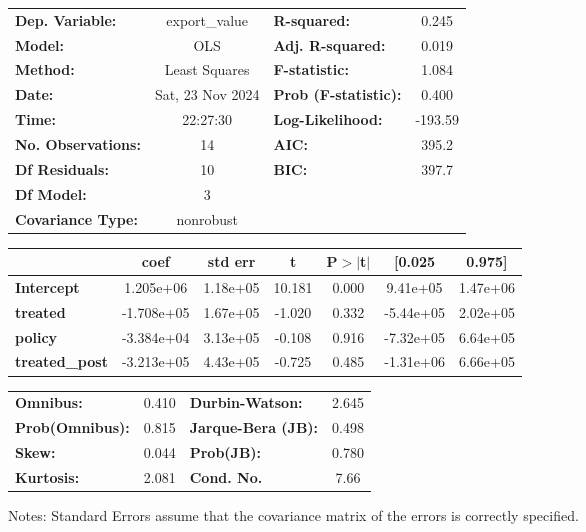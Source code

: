 \begin{center}
\begin{tabular}{lclc}
\toprule
\textbf{Dep. Variable:}    &  export\_value   & \textbf{  R-squared:         } &     0.245   \\
\textbf{Model:}            &       OLS        & \textbf{  Adj. R-squared:    } &     0.019   \\
\textbf{Method:}           &  Least Squares   & \textbf{  F-statistic:       } &     1.084   \\
\textbf{Date:}             & Sat, 23 Nov 2024 & \textbf{  Prob (F-statistic):} &    0.400    \\
\textbf{Time:}             &     22:27:30     & \textbf{  Log-Likelihood:    } &   -193.59   \\
\textbf{No. Observations:} &          14      & \textbf{  AIC:               } &     395.2   \\
\textbf{Df Residuals:}     &          10      & \textbf{  BIC:               } &     397.7   \\
\textbf{Df Model:}         &           3      & \textbf{                     } &             \\
\textbf{Covariance Type:}  &    nonrobust     & \textbf{                     } &             \\
\bottomrule
\end{tabular}
\begin{tabular}{lcccccc}
                       & \textbf{coef} & \textbf{std err} & \textbf{t} & \textbf{P$> |$t$|$} & \textbf{[0.025} & \textbf{0.975]}  \\
\midrule
\textbf{Intercept}     &    1.205e+06  &     1.18e+05     &    10.181  &         0.000        &     9.41e+05    &     1.47e+06     \\
\textbf{treated}       &   -1.708e+05  &     1.67e+05     &    -1.020  &         0.332        &    -5.44e+05    &     2.02e+05     \\
\textbf{policy}        &   -3.384e+04  &     3.13e+05     &    -0.108  &         0.916        &    -7.32e+05    &     6.64e+05     \\
\textbf{treated\_post} &   -3.213e+05  &     4.43e+05     &    -0.725  &         0.485        &    -1.31e+06    &     6.66e+05     \\
\bottomrule
\end{tabular}
\begin{tabular}{lclc}
\textbf{Omnibus:}       &  0.410 & \textbf{  Durbin-Watson:     } &    2.645  \\
\textbf{Prob(Omnibus):} &  0.815 & \textbf{  Jarque-Bera (JB):  } &    0.498  \\
\textbf{Skew:}          &  0.044 & \textbf{  Prob(JB):          } &    0.780  \\
\textbf{Kurtosis:}      &  2.081 & \textbf{  Cond. No.          } &     7.66  \\
\bottomrule
\end{tabular}
\end{center}

Notes: \newline
 [1] Standard Errors assume that the covariance matrix of the errors is correctly specified.
